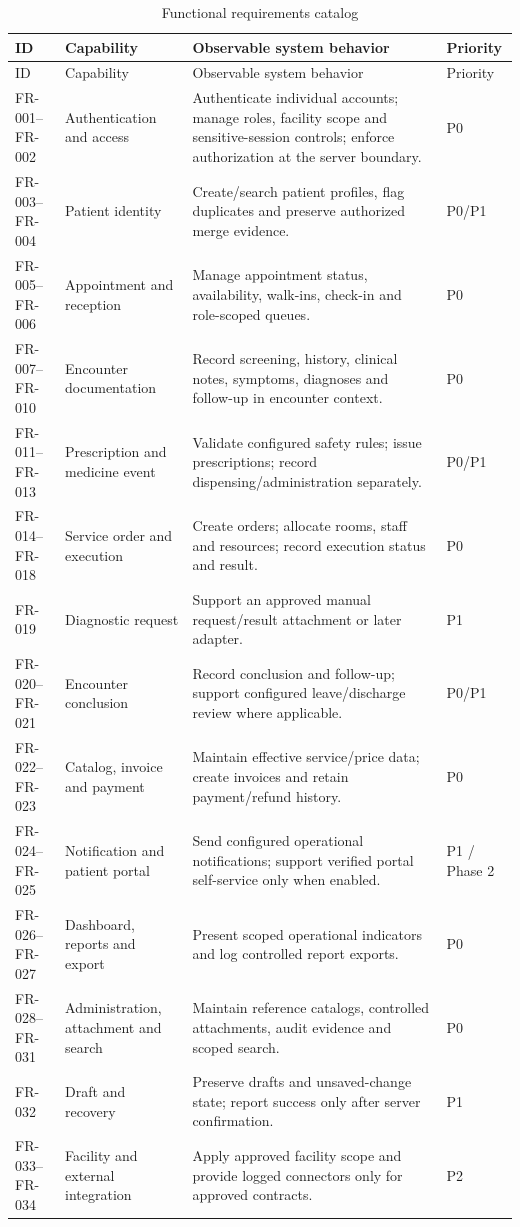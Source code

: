 \documentclass[a4paper,12pt]{article}
\begin{document}
\begingroup
\scriptsize
\renewcommand{\arraystretch}{1.10}
\begin{longtable}{@{}p{}p{}p{}p{}@{}}
\caption{Functional requirements catalog}\label{tab:functional-requirements}\\
\toprule ID & Capability & Observable system behavior & Priority \\
\midrule
\endfirsthead
\toprule ID & Capability & Observable system behavior & Priority \\
\midrule
\endhead
FR-001--FR-002 & Authentication and access & Authenticate individual accounts; manage roles, facility scope and sensitive-session controls; enforce authorization at the server boundary. & P0 \\
FR-003--FR-004 & Patient identity & Create/search patient profiles, flag duplicates and preserve authorized merge evidence. & P0/P1 \\
FR-005--FR-006 & Appointment and reception & Manage appointment status, availability, walk-ins, check-in and role-scoped queues. & P0 \\
FR-007--FR-010 & Encounter documentation & Record screening, history, clinical notes, symptoms, diagnoses and follow-up in encounter context. & P0 \\
FR-011--FR-013 & Prescription and medicine event & Validate configured safety rules; issue prescriptions; record dispensing/administration separately. & P0/P1 \\
FR-014--FR-018 & Service order and execution & Create orders; allocate rooms, staff and resources; record execution status and result. & P0 \\
FR-019 & Diagnostic request & Support an approved manual request/result attachment or later adapter. & P1 \\
FR-020--FR-021 & Encounter conclusion & Record conclusion and follow-up; support configured leave/discharge review where applicable. & P0/P1 \\
FR-022--FR-023 & Catalog, invoice and payment & Maintain effective service/price data; create invoices and retain payment/refund history. & P0 \\
FR-024--FR-025 & Notification and patient portal & Send configured operational notifications; support verified portal self-service only when enabled. & P1 / Phase 2 \\
FR-026--FR-027 & Dashboard, reports and export & Present scoped operational indicators and log controlled report exports. & P0 \\
FR-028--FR-031 & Administration, attachment and search & Maintain reference catalogs, controlled attachments, audit evidence and scoped search. & P0 \\
FR-032 & Draft and recovery & Preserve drafts and unsaved-change state; report success only after server confirmation. & P1 \\
FR-033--FR-034 & Facility and external integration & Apply approved facility scope and provide logged connectors only for approved contracts. & P2 \\
\bottomrule
\end{longtable}
\endgroup
\end{document}
